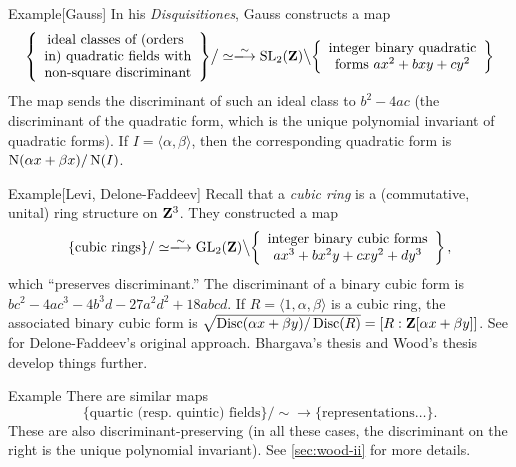 \begin{enonce}[remark]{Example}[Gauss]
In his \emph{Disquisitiones}, Gauss constructs a map 
\[
  \left\{\begin{array}{c}\text{ideal classes of (orders } \\ \text{in) quadratic fields with} \\ \text{non-square discriminant}\end{array}\right\}\bigr/\simeq 
  \iso 
  \speciallinear_2(\dZ)\bigl\backslash \left\{\begin{array}{c}\text{integer binary quadratic} \\ \text{forms }a x^2+b x y+c y^2\end{array} \right\} 
\]
The map sends the discriminant of such an ideal class to $b^2-4 a c$ (the 
discriminant of the quadratic form, which is the unique polynomial invariant 
of quadratic forms). If $I=\langle \alpha,\beta\rangle$, then 
the corresponding quadratic form is $\operatorname{N}(\alpha x+\beta x)/\operatorname{N}(I)$. 
\end{enonce}

\begin{enonce}[remark]{Example}[Levi, Delone-Faddeev] %
Recall that a \emph{cubic ring} is a (commutative, unital) ring structure 
on $\mathbf{Z}^3$. They constructed a map 
\[
  \{\text{cubic rings}\}/\simeq \iso \generallinear_2(\dZ)\bigl\backslash\left\{\begin{array}{c}\text{integer binary cubic forms} \\ ax^3+b x^2 y+c x y^2+d y^3\end{array}\right\} ,
\]
which ``preserves discriminant.'' The discriminant of a binary cubic form is 
$b c^2-4 a c^3 - 4 b^3 d - 27 a^2 d^2 + 18 a b c d$. If 
$R=\langle 1,\alpha,\beta\rangle$ is a cubic ring, the associated binary cubic 
form is 
$\sqrt{\operatorname{Disc}(\alpha x+\beta y)/\operatorname{Disc}(R)} = [R:\mathbf{Z}[\alpha x+\beta y]]$. 
See \cite{df64} for Delone-Faddeev's original approach. Bhargava's thesis 
\cite{b01} and Wood's thesis \cite{w09} develop things further. 
\end{enonce}

\begin{enonce}[remark]{Example} %
There are similar maps 
\[
  \{\text{quartic (resp.~quintic) fields}\}/\sim \to \{\text{representations\ldots}\} .
\]
These are also discriminant-preserving (in all these cases, the discriminant on 
the right is the unique polynomial invariant). See \autoref{sec:wood-ii} for 
more details. 
\end{enonce}

